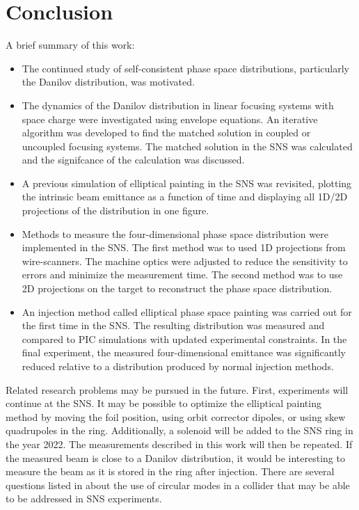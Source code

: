 \chapter{Conclusion} \label{chap-6}

A brief summary of this work:
%
\begin{itemize}
    \item The continued study of self-consistent phase space distributions, particularly the Danilov distribution, was motivated.
    \item The dynamics of the Danilov distribution in linear focusing systems with space charge were investigated using envelope equations. An iterative algorithm was developed to find the matched solution in coupled or uncoupled focusing systems. The matched solution in the SNS was calculated and the signifcance of the calculation was discussed.
    \item A previous simulation of elliptical painting in the SNS was revisited, plotting the intrinsic beam emittance as a function of time and displaying all 1D/2D projections of the distribution in one figure.
    \item Methods to measure the four-dimensional phase space distribution were implemented in the SNS. The first method was to used 1D projections from wire-scanners. The machine optics were adjusted to reduce the sensitivity to errors and minimize the measurement time. The second method was to use 2D projections on the target to reconstruct the phase space distribution. 
    \item An injection method called elliptical phase space painting was carried out for the first time in the SNS. The resulting distribution was measured and compared to PIC simulations with updated experimental constraints. In the final experiment, the measured four-dimensional emittance was significantly reduced relative to a distribution produced by normal injection methods.
\end{itemize}
%

Related research problems may be pursued in the future. First, experiments will continue at the SNS. It may be possible to optimize the elliptical painting method by moving the foil position, using orbit corrector dipoles, or using skew quadrupoles in the ring. Additionally, a solenoid will be added to the SNS ring in the year 2022. The measurements described in this work will then be repeated. If the measured beam is close to a Danilov distribution, it would be interesting to measure the beam as it is stored in the ring after injection. There are several questions listed in \cite{Burov2013} about the use of circular modes in a collider that may be able to be addressed in SNS experiments.

